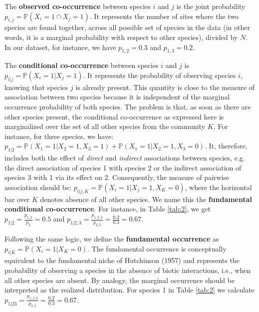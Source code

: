 The \textbf{observed co-occurrence} between species $i$ and $j$ is
the joint probability $p_{i,j}=\mathbb{P}(X_{i}=1 \cap X_{j}=1)$. It represents the
number of sites where the two species are found together, across all possible
set of species in the data (in other words, it is a marginal probability
with respect to other species), divided by $N$. In our dataset, for instance, we have $p_{1,2}=0.3$ and $p_{1,3}=0.2$.

The \textbf{conditional co-occurrence} between species $i$ and $j$ is
$p_{i|j}=\mathbb{P}(X_{i}=1| X_{j}=1)$. It represents the probability of
observing species $i$, knowing that species $j$ is already present. This
quantity is close to the measure of association between two
species because it is independent of the marginal occurrence probability of
both species. The problem is that, as soon as there are other species present,
the conditional co-occurrence as expressed here is marginalized over the set
of all other species from the community $K$. For instance, for three species, we have:
 $p_{1|2} = \mathbb{P}(X_{1}=1| X_{2}=1,X_{3}=1) + \mathbb{P}(X_{1}=1| X_{2}=1,X_{3}=0)$.
It, therefore, includes both the effect of \emph{direct} and \emph{indirect} associations between species, e.g. the direct association of species 1 with species 2 or the indirect association of species 3 with 1 via its effect on 2.
Consequently, the measure of pairwise association should be: $p_{i|j,\overline{K}}=\mathbb{P}(X_{i}=1| X_{j}=1,X_{K}=0)$,
where the horizontal bar over $K$ denotes absence of all other species. We
name this the \textbf{fundamental conditional co-occurrence}. For instance, in Table \ref{tab:2}, we get $p_{1|2}=\frac{p_{1,2}}{p_2}=0.5$ and $p_{1|2,\overline{3}}=\frac{p_{1,2,\overline{3}}}{p_{2,\overline{3}}}=\frac{0.2}{0.3}=0.67$.

Following the same logic, we define the \textbf{fundamental occurrence} as
$p_{i|\overline{K}}=\mathbb{P}(X_{i}=1| X_{K}=0)$. The fundamental occurrence
is conceptually equivalent to the fundamental niche of Hutchinson (1957) and
represents the probability of observing a species in the absence of biotic interactions,
i.e., when all other species are absent.
 By analogy, the marginal occurrence should be interpreted as the
realized distribution. For species 1 in Table \ref{tab:2} we calculate $p_{1|\overline{23}}=\frac{p_{1,\overline{2},\overline{3}}}{p_{\overline{2},\overline{3}}}=\frac{0.2}{0.3}=0.67$.

